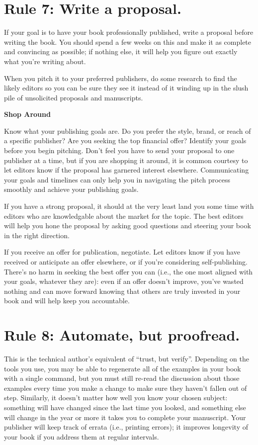\documentclass[10pt,letterpaper]{article}
\begin{document}
\section*{Rule 7: Write a proposal.}

If your goal is to have your book professionally published,
write a proposal before writing the book.
You should spend a few weeks on this
and make it as complete and convincing as possible;
if nothing else,
it will help you figure out exactly what you're writing about.

When you pitch it to your preferred publishers,
do some research to find the likely editors
so you can be sure they see it
instead of it winding up in the slush pile of unsolicited proposals and manuscripts.

\begin{mdframed}
\textbf{Shop Around}

\noindent
Know what your publishing goals are.
Do you prefer the style, brand, or reach of a specific publisher?
Are you seeking the top financial offer?
Identify your goals before you begin pitching.
Don't feel you have to send your proposal to one publisher at a time,
but if you are shopping it around,
it is common courtesy to let editors know if the proposal has garnered interest elsewhere.
Communicating your goals and timelines can only help you
in navigating the pitch process smoothly and achieve your publishing goals.
\end{mdframed}

If you have a strong proposal,
it should at the very least land you some time with editors
who are knowledgable about the market for the topic.
The best editors will help you hone the proposal
by asking good questions and steering your book in the right direction.

If you receive an offer for publication, negotiate.
Let editors know if you have received or anticipate an offer elsewhere, 
or if you're considering self-publishing.
There's no harm in seeking the best offer you can (i.e., the one
most aligned with your goals, whatever they are):
even if an offer doesn't improve, you've wasted nothing
and can move forward knowing that others are truly invested in your book
and will help keep you accountable.

\section*{Rule 8: Automate, but proofread.}

This is the technical author's equivalent of ``trust, but verify''.
Depending on the tools you use,
you may be able to regenerate all of the examples in your book with a single command,
but you must still re-read the discussion about those examples every time you make a change
to make sure they haven't fallen out of step.
Similarly,
it doesn't matter how well you know your chosen subject:
something will have changed since the last time you looked,
and something else will change in the year or more it takes you to complete your manuscript.
Your publisher will keep track of errata (i.e., printing errors);
it improves longevity of your book if you address them at regular intervals.
\end{document}
